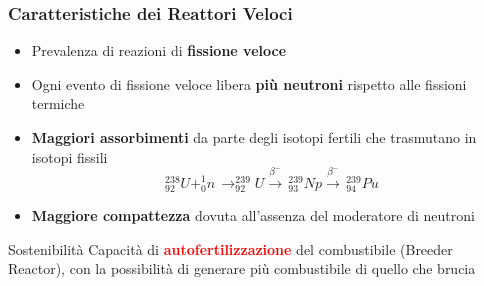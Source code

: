  \begin{frame}
  \frametitle{Caratteristiche dei Reattori Veloci}
  \vspace{0.4cm}
  \begin{center}
  \begin{itemize}
  \item Prevalenza di reazioni di \textbf{fissione veloce}
  \item Ogni evento di fissione veloce libera \textbf{più neutroni} rispetto alle fissioni termiche
  \item \textbf{Maggiori assorbimenti} da parte degli isotopi fertili che trasmutano in isotopi fissili
  \begin{equation*}
 ^{238}_{92}U + ^{1}_{0}n \, \longrightarrow ^{239}_{92}U  \xrightarrow{\beta^-}
 \, ^{239}_{93}Np  \xrightarrow{\beta^-} \, ^{239}_{94}Pu
 \end{equation*}
  \item \textbf{Maggiore compattezza} dovuta all'assenza del moderatore di neutroni
 \end{itemize}
 \begin{block}{Sostenibilità}
 Capacità di \textbf{\textcolor{red}{autofertilizzazione}} del combustibile (Breeder Reactor), con la possibilità di generare più combustibile di quello che brucia
 \end{block}
 
 \end{center}
 \end{frame}

